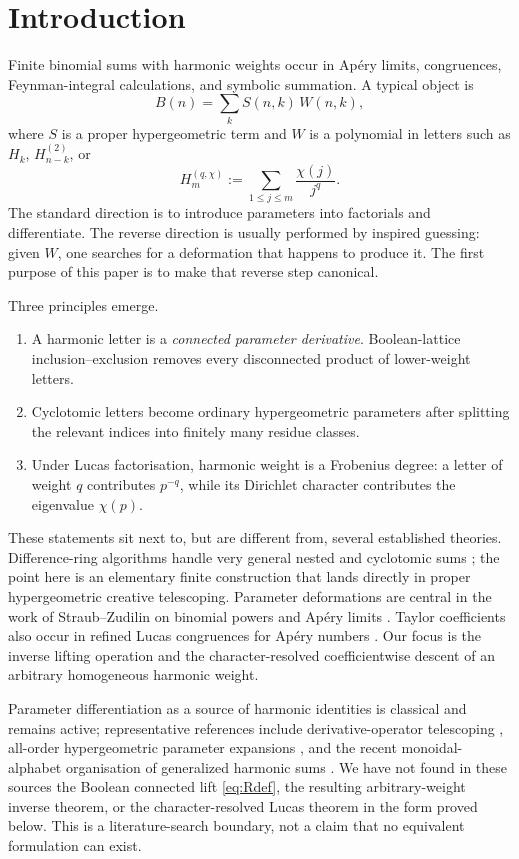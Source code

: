 \documentclass[11pt]{article}
\theoremstyle{definition}
\theoremstyle{remark}
\begin{document}
\section{Introduction}

Finite binomial sums with harmonic weights occur in Ap\'ery limits, congruences,
Feynman-integral calculations, and symbolic summation.  A typical object is
\begin{equation}\label{eq:typical}
 B(n)=\sum_k S(n,k)\,W(n,k),
\end{equation}
where $S$ is a proper hypergeometric term and $W$ is a polynomial in letters such as
$H_k$, $H_{n-k}^{(2)}$, or
\[
 H_m^{(q,\chi)}:=\sum_{1\le j\le m}\frac{\chi(j)}{j^q}.
\]
The standard direction is to introduce parameters into factorials and differentiate.
The reverse direction is usually performed by inspired guessing: given $W$, one searches
for a deformation that happens to produce it.  The first purpose of this paper is to make
that reverse step canonical.

Three principles emerge.
\begin{enumerate}[leftmargin=2em]
\item A harmonic letter is a \emph{connected parameter derivative}.  Boolean-lattice
  inclusion--exclusion removes every disconnected product of lower-weight letters.
\item Cyclotomic letters become ordinary hypergeometric parameters after splitting the
  relevant indices into finitely many residue classes.
\item Under Lucas factorisation, harmonic weight is a Frobenius degree: a letter of
  weight $q$ contributes $p^{-q}$, while its Dirichlet character contributes the
  eigenvalue $\chi(p)$.
\end{enumerate}

These statements sit next to, but are different from, several established theories.
Difference-ring algorithms handle very general nested and cyclotomic sums
\cite{Schneider2016,ABS2011}; the point here is an elementary finite construction that
lands directly in proper hypergeometric creative telescoping.  Parameter deformations
are central in the work of Straub--Zudilin on binomial powers and Ap\'ery limits
\cite{StraubZudilin}.  Taylor coefficients also occur in refined Lucas congruences for
Ap\'ery numbers \cite{RowlandYassawiKratt}.  Our focus is the inverse lifting operation
and the character-resolved coefficientwise descent of an arbitrary homogeneous harmonic
weight.

Parameter differentiation as a source of harmonic identities is classical and remains
active; representative references include derivative-operator telescoping
\cite{WeiGong}, all-order hypergeometric parameter expansions \cite{KalmykovWardYost},
and the recent monoidal-alphabet organisation of generalized harmonic sums
\cite{Phadikar}.  We have not found in these sources the Boolean connected lift
\eqref{eq:Rdef}, the resulting arbitrary-weight inverse theorem, or the
character-resolved Lucas theorem in the form proved below.  This is a literature-search
boundary, not a claim that no equivalent formulation can exist.
\end{document}
